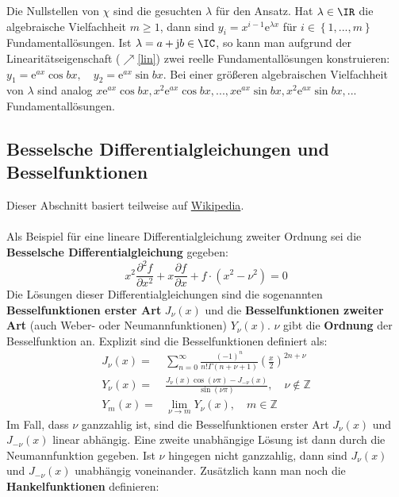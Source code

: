 Die Nullstellen von $\chi$ sind die gesuchten $\lambda$ für den Ansatz. Hat $\lambda\in\IR$ die algebraische Vielfachheit $m\geq 1$, dann sind $y_i=x^{i-1}\mathrm{e}^{\lambda x}$ für $i\in\left\{1,...,m\right\}$ Fundamentallösungen. Ist $\lambda=a+\mathrm{j} b\in\IC$, so kann man aufgrund der Linearitätseigenschaft ($\nearrow$\ref{lin}) zwei reelle Fundamentallösungen konstruieren: $y_1=\mathrm{e}^{a x}\cos bx, \quad y_2=\mathrm{e}^{a x}\sin bx$. Bei einer größeren algebraischen Vielfachheit von $\lambda$ sind analog $x\mathrm{e}^{a x}\cos bx,x^2\mathrm{e}^{a x}\cos bx,...,x\mathrm{e}^{a x}\sin bx,x^2\mathrm{e}^{a x}\sin bx,...$ Fundamentallösungen.
\subsection{Besselsche Differentialgleichungen und Besselfunktionen}\label{bessel}
Dieser Abschnitt basiert teilweise auf \href{https://de.wikipedia.org/wiki/Bessel-Funktion}{Wikipedia}.\\\\
Als Beispiel für eine lineare Differentialgleichung zweiter Ordnung sei die \textbf{Besselsche Differentialgleichung} gegeben:
\begin{equation}
	x^2 \frac{\partial^2 f}{\partial x^2} + x \frac{\partial f}{\partial x} + f\cdot (x^2 - \nu^2) = 0
\end{equation}
Die Lösungen dieser Differentialgleichungen sind die sogenannten \textbf{Besselfunktionen erster Art} $J_\nu(x)$ und die \textbf{Besselfunktionen zweiter Art} (auch Weber- oder Neumannfunktionen) $Y_\nu(x)$. $\nu$ gibt die \textbf{Ordnung} der Besselfunktion an. Explizit sind die Besselfunktionen definiert als:
\begin{equation}\begin{split}
		J_\nu(x) =& \sum_{n=0}^\infty \frac{(-1)^n}{n! \Gamma(n+\nu+1)} \left(\frac{x}{2}\right)^{2n+\nu}\\
		Y_\nu(x) =& \frac{J_\nu(x) \cos(\nu \pi) - J_{-\nu}(x)}{\sin(\nu \pi)}, \quad \nu \notin \mathbb{Z}\\
		Y_m(x) =& \lim\limits_{\nu\to m} Y_\nu (x), \quad m \in \mathbb{Z}
\end{split}\end{equation}
Im Fall, dass $\nu$ ganzzahlig ist, sind die Besselfunktionen erster Art $J_\nu(x)$ und $J_{-\nu}(x)$ linear abhängig. Eine zweite unabhängige Lösung ist dann durch die Neumannfunktion gegeben. Ist $\nu$ hingegen nicht ganzzahlig, dann sind $J_\nu(x)$ und $J_{-\nu}(x)$ unabhängig voneinander. Zusätzlich kann man noch die \textbf{Hankelfunktionen} definieren:
